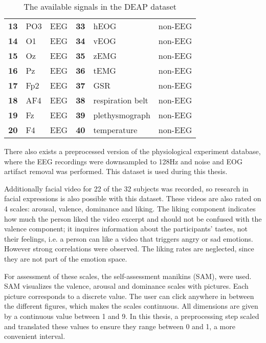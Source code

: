 \begin{table}[H]
\begin{tabular}{l|ll|l|ll}
\textbf{13}      & PO3           & EEG               & \textbf{33}      & hEOG             & non-EEG           \\
\textbf{14}      & O1            & EEG               & \textbf{34}      & vEOG             & non-EEG           \\
\textbf{15}      & Oz            & EEG               & \textbf{35}      & zEMG             & non-EEG           \\
\textbf{16}      & Pz            & EEG               & \textbf{36}      & tEMG             & non-EEG           \\
\textbf{17}      & Fp2           & EEG               & \textbf{37}      & GSR              & non-EEG           \\
\textbf{18}      & AF4           & EEG               & \textbf{38}      & respiration belt & non-EEG           \\
\textbf{19}      & Fz            & EEG               & \textbf{39}      & plethysmograph   & non-EEG           \\
\textbf{20}      & F4            & EEG               & \textbf{40}      & temperature      & non-EEG          
\end{tabular}
\caption{The available signals in the DEAP dataset}
\end{table}

\npar

There also exists a preprocessed version of the physiological experiment database, where the EEG recordings were downsampled to 128Hz and noise and EOG artifact removal was performed. This dataset is used during this thesis.

\npar

Additionally facial video for 22 of the 32 subjects was recorded, so research in facial expressions is also possible with this dataset. These videos are also rated on 4 scales: arousal, valence, dominance and liking. The liking component indicates how much the person liked the video excerpt and should not be confused with the valence component; it inquires information about the participants' tastes, not their feelings, i.e. a person can like a video that triggers angry or sad emotions. However strong correlations were observed\citep{DEAP}. The liking rates are neglected, since they are not part of the emotion space.

\npar

For assessment of these scales, the self-assessment manikins (SAM), were used\cite{DEAP}. SAM visualizes the valence, arousal and dominance scales with pictures. Each picture corresponds to a discrete value. The user can click anywhere in between the different figures, which makes the scales continuous. All dimensions are given by a continuous value between 1 and 9. In this thesis, a preprocessing step scaled and translated these values to ensure they range between 0 and 1, a more convenient interval.

